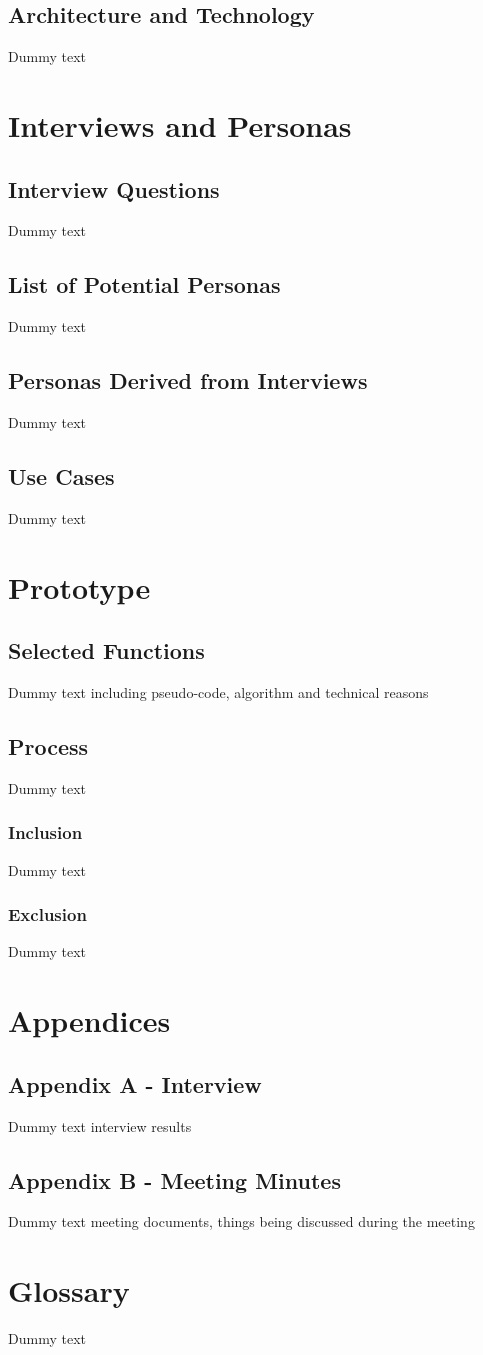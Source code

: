 \documentclass[12pt]{article}
\begin{document}
\subsection{Architecture and Technology}
Dummy text

\section{Interviews and Personas}

\subsection{Interview Questions}
Dummy text


\subsection{List of Potential Personas}
Dummy text

\subsection{Personas Derived from Interviews}
Dummy text

\subsection{Use Cases}
Dummy text

\section{Prototype}

\subsection{Selected Functions}
Dummy text
including pseudo-code, algorithm and technical reasons

\subsection{Process}
Dummy text

\subsubsection{Inclusion}
Dummy text

\subsubsection{Exclusion}
Dummy text


\section{Appendices}
\subsection{Appendix A - Interview  }
Dummy text
interview results

\subsection{Appendix B - Meeting Minutes}
Dummy text
meeting documents, things being discussed during the meeting

\section{Glossary}
Dummy text
\end{document}
